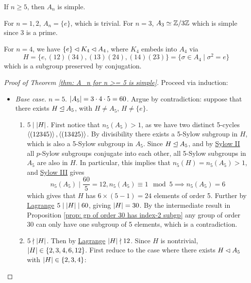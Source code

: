 \documentclass{article}
\begin{document}
\begin{theorem}\label{thm: A_n for n >= 5 is simple}
    If $n \geq 5$, then $A_n$ is simple. 
\end{theorem}

\begin{remark}
    For $n = 1, 2$, $A_n = \{e\}$, which is trivial. For $n = 3$, $A_3 \simeq \mathbb{Z}/3\mathbb{Z}$ which is simple since 3 is a prime.

    For $n = 4$, we have $\{e\} \lhd K_4 \lhd A_4$, where $K_4$ embeds into $A_4$ via
    \[
        H = \{e, (1 2) (3 4), (1 3)(2 4), (1 4)(2 3)\} = \{\sigma \in A_4 \mid \sigma^2 = e\}
    \]
    which is a subgroup preserved by conjugation.
\end{remark}

\begin{proof}[Proof of Theorem \ref{thm: A_n for n >= 5 is simple}]
    Proceed via induction:
    \begin{itemize}
        \item \emph{Base case.} $n = 5$. $\left|A_5\right| = 3 \cdot 4 \cdot 5 = 60$. Argue by contradiction: suppose that there exists $H \unlhd A_5$, with $H \neq A_5$, $H \neq \{e\}$.
        \begin{enumerate}
            \item[\bu{Case 1.}] $5 \mid \left|H\right|$. First notice that $n_5(A_5) > 1$, as we have two distinct 5-cycles $\left\langle (1 2 3 4 5) \right\rangle, \left\langle (1 3 4 2 5) \right\rangle$. By divisibility there exists a 5-Sylow subgroup in $H$, which is also a 5-Sylow subgroup in $A_5$. Since $H \unlhd A_5$, and by \hyperref[thm: Sylow II]{Sylow II} all $p$-Sylow subgroups conjugate into each other, all 5-Sylow subgroups in $A_5$ are also in $H$. In particular, this implies that $n_5(H) = n_5(A_5) > 1$, and \hyperref[thm: Sylow III]{Sylow III} gives
            \[
                n_5(A_5) \mid \frac{60}{5} = 12, n_5(A_5)\equiv 1 \mod{5} \implies n_5(A_5) = 6
            \]
            which gives that $H$ has $6 \times (5 - 1) = 24$ elements of order 5. Further by \hyperref[thm: Lagrange]{Lagrange} $5 \mid \left|H\right| \mid 60$, giving $\left|H\right| = 30$. By the intermediate result in Proposition \ref{prop: gp of order 30 has index-2 subgp} any group of order 30 can only have one subgroup of 5 elements, which is a contradiction.
            \item[\bu{Case 2.}] $5 \nmid \left|H\right|$. Then by \hyperref[thm: Lagrange]{Lagrange} $\left|H\right| \nmid 12$. Since $H$ is nontrivial, $\left|H\right| \in \{2, 3, 4, 6, 12\}$. First reduce to the case where there exists $H \lhd A_5$ with $\left|H\right| \in \{2, 3, 4\}$:

\end{enumerate}
\end{itemize}
\end{proof}
\end{document}
